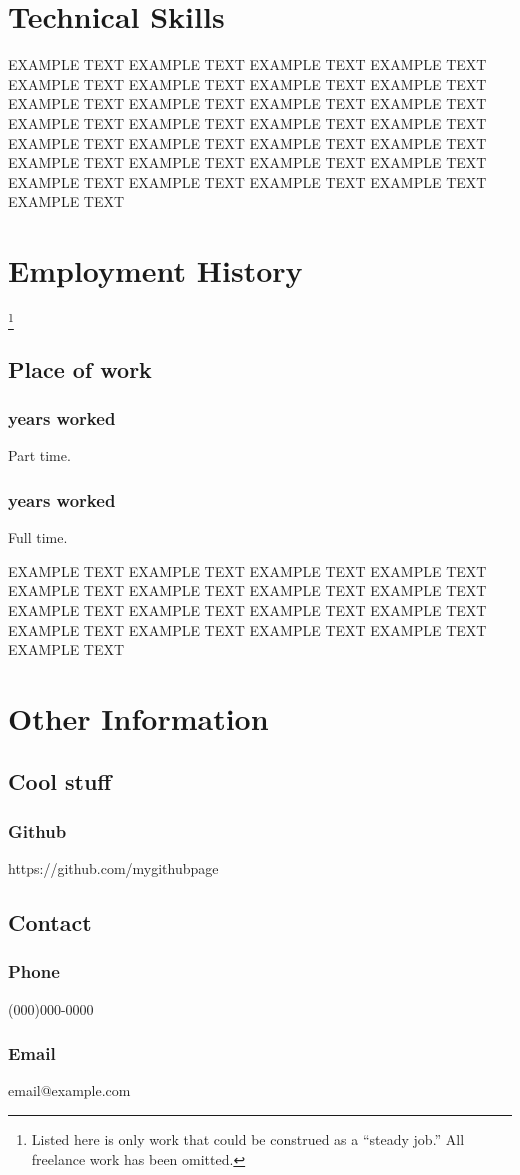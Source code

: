\documentclass{article}
\begin{document}
\section{Technical Skills}
EXAMPLE TEXT EXAMPLE TEXT EXAMPLE TEXT EXAMPLE TEXT EXAMPLE TEXT EXAMPLE TEXT EXAMPLE TEXT EXAMPLE TEXT EXAMPLE TEXT EXAMPLE TEXT EXAMPLE TEXT EXAMPLE TEXT EXAMPLE TEXT EXAMPLE TEXT EXAMPLE TEXT EXAMPLE TEXT EXAMPLE TEXT EXAMPLE TEXT EXAMPLE TEXT EXAMPLE TEXT EXAMPLE TEXT EXAMPLE TEXT EXAMPLE TEXT EXAMPLE TEXT EXAMPLE TEXT EXAMPLE TEXT EXAMPLE TEXT EXAMPLE TEXT EXAMPLE TEXT

\newpage

\section{Employment History}\footnote{Listed here is only work that could be construed as a ``steady job.'' All freelance work has been omitted.}
\subsection{Place of work}
\subsubsection{years worked} Part time. \subsubsection{years worked} Full time.

EXAMPLE TEXT EXAMPLE TEXT EXAMPLE TEXT EXAMPLE TEXT EXAMPLE TEXT EXAMPLE TEXT EXAMPLE TEXT EXAMPLE TEXT EXAMPLE TEXT EXAMPLE TEXT EXAMPLE TEXT EXAMPLE TEXT EXAMPLE TEXT EXAMPLE TEXT EXAMPLE TEXT EXAMPLE TEXT EXAMPLE TEXT

\section{Other Information}
\subsection{Cool stuff}
\subsubsection{Github} https://github.com/mygithubpage

\subsection{Contact}
\subsubsection{Phone} (000)000-0000
\subsubsection{Email} email@example.com
\end{document}
